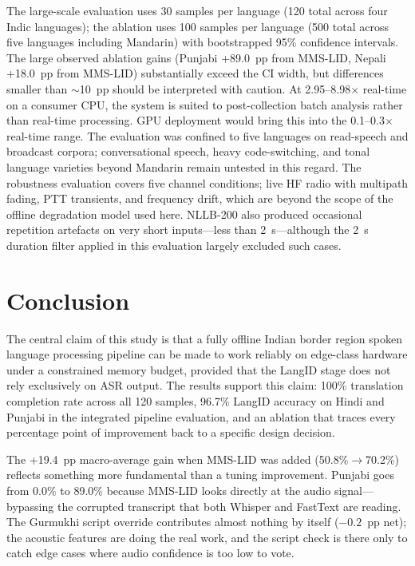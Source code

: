 \documentclass[12pt, onecolumn]{IEEEtran}
\begin{document}
The large-scale evaluation uses 30 samples per language (120 total across four Indic languages); the ablation uses 100 samples per language (500 total across five languages including Mandarin) with bootstrapped 95\% confidence intervals. The large observed ablation gains (Punjabi +89.0~pp from MMS-LID, Nepali +18.0~pp from MMS-LID) substantially exceed the CI width, but differences smaller than $\sim$10~pp should be interpreted with caution. At 2.95--8.98$\times$ real-time on a consumer CPU, the system is suited to post-collection batch analysis rather than real-time processing. GPU deployment would bring this into the 0.1--0.3$\times$ real-time range. The evaluation was confined to five languages on read-speech and broadcast corpora; conversational speech, heavy code-switching, and tonal language varieties beyond Mandarin remain untested in this regard. The robustness evaluation covers five channel conditions; live HF radio with multipath fading, PTT transients, and frequency drift, which are beyond the scope of the offline degradation model used here. NLLB-200 also produced occasional repetition artefacts on very short inputs---less than 2~s---although the 2~s duration filter applied in this evaluation largely excluded such cases.

\section{Conclusion}

The central claim of this study is that a fully offline Indian border region spoken language processing pipeline can be made to work reliably on edge-class hardware under a constrained memory budget, provided that the LangID stage does not rely exclusively on ASR output. The results support this claim: 100\% translation completion rate across all 120 samples, 96.7\% LangID accuracy on Hindi and Punjabi in the integrated pipeline evaluation, and an ablation that traces every percentage point of improvement back to a specific design decision.

The +19.4~pp macro-average gain when MMS-LID was added (50.8\%$\rightarrow$70.2\%) reflects something more fundamental than a tuning improvement. Punjabi goes from 0.0\% to 89.0\% because MMS-LID looks directly at the audio signal---bypassing the corrupted transcript that both Whisper and FastText are reading. The Gurmukhi script override contributes almost nothing by itself ($-0.2$~pp net); the acoustic features are doing the real work, and the script check is there only to catch edge cases where audio confidence is too low to vote.
\end{document}
